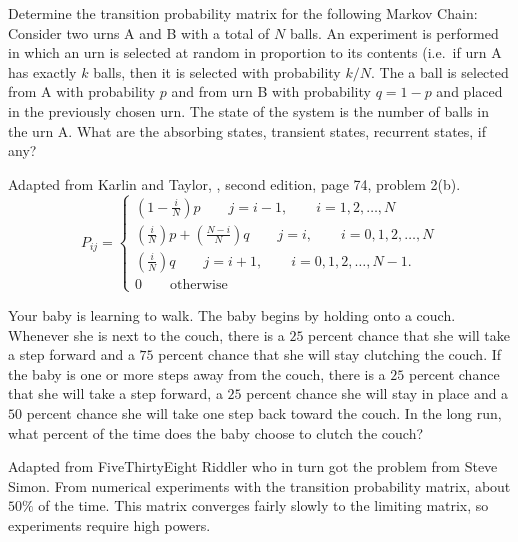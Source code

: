 \documentclass[12pt]{article}
\begin{document}
\begin{exercise}
    Determine the transition probability matrix for the following Markov
    Chain:  Consider two urns A and B with a total of \( N \) balls.  An
    experiment is performed in which an urn is selected at random in
    proportion to its contents (i.e.\ if urn A has exactly \( k \)
    balls, then it is selected with probability \( k/N \).  The a ball
    is selected from A with probability \( p \) and from urn B with
    probability \( q = 1-p \) and placed in the previously chosen urn.
    The state of the system is the number of balls in the urn A. What
    are the absorbing states, transient states, recurrent states, if
    any?
\end{exercise}
\begin{solution}
    Adapted from Karlin and Taylor, , second edition, page 74, problem 2(b).
    \[
        P_{ij} =
        \begin{cases}
            \left( 1-\frac{i}{N}\right)p \qquad j = i-1, \qquad i=1,2,\dots,N
            \\
            \left( \frac{i}{N} \right) p + \left( \frac{N-i}{N} \right)
            q \qquad j = i, \qquad i=0,1,2,\dots,N \\
            \left( \frac{i}{N} \right) q \qquad j = i+1, \qquad i=0,1,2,\dots,N-1.
            \\
            0 \qquad \text{otherwise}
        \end{cases}
    \]
\end{solution}

\begin{exercise}
    Your baby is learning to walk.  The baby begins by holding onto a
    couch.  Whenever she is next to the couch, there is a \( 25 \)
    percent chance that she will take a step forward and a \( 75 \)
    percent chance that she will stay clutching the couch.  If the baby
    is one or more steps away from the couch, there is a \( 25 \)
    percent chance that she will take a step forward, a \( 25 \) percent
    chance she will stay in place and a \( 50 \) percent chance she will
    take one step back toward the couch.  In the long run, what percent
    of the time does the baby choose to clutch the couch?
\end{exercise}
\begin{solution}
    Adapted from 
    {FiveThirtyEight Riddler} who in turn got the problem from Steve
    Simon.  From numerical experiments with the transition probability
    matrix, about \( 50\% \) of the time.  This matrix converges fairly
    slowly to the limiting matrix, so experiments require high powers.
\end{solution}
\end{document}
